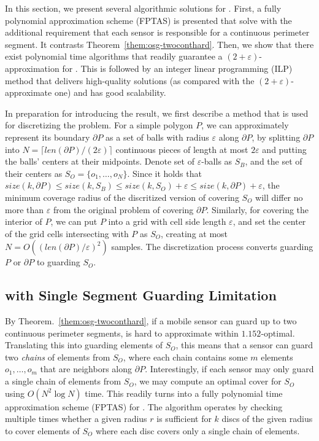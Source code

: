 \def\algomed{\textsc{Min\_Enclose\_Disc}\xspace}
In this section, we present several algorithmic solutions for \osgt. 
First, a fully polynomial approximation scheme (FPTAS)
is presented that solve \opgt with the additional requirement 
that each sensor is responsible for a continuous perimeter segment. 
It contrasts Theorem~\ref{them:osg-twoconthard}. Then, we show that 
there exist polynomial time algorithms that readily guarantee a
$(2+\varepsilon)$-approximation for \osgt. This is followed by an 
integer linear programming (ILP) method that delivers high-quality
solutions (as compared with the $(2 + \varepsilon)$-approximate one)
and has good scalability. 

In preparation for introducing the result, we first describe a method
that is used for discretizing the problem. For a simple polygon $P$, 
we can approximately represent its boundary $\partial P$ as a set of 
balls with radius $\varepsilon$ along $\partial P$, by splitting  
$\partial P$ into $N=\lceil{len(\partial P)}/({2\varepsilon})\rceil$ 
continuous pieces of length at most $2\varepsilon$ and putting the balls' 
centers at their midpoints. 
%
Denote set of $\varepsilon$-balls as $S_B$, and the set of their centers 
as $S_O=\{o_1,\dots, o_N\}$. Since it holds that $size(k,\partial P) \leq 
size(k, S_B) \leq size(k, S_O) + \varepsilon \leq size(k, \partial P) 
+ \varepsilon$, the minimum coverage radius of the discritized version 
of covering $S_O$ will differ no more than $\varepsilon$ from the original 
problem of covering $\partial P$. Similarly, for covering the interior 
of $P$, we can put $P$ into a grid with cell side length $\varepsilon$, 
and set the center of the grid cells intersecting with $P$ as $S_O$, 
creating at most $N=O(({len(\partial P)}/{\varepsilon})^2)$ samples. 
The discretization process converts guarding $P$ or $\partial P$ to 
guarding $S_O$. 

\subsection{\opgt with Single Segment Guarding Limitation}\label{subsec:osg-singleseg}
By Theorem.~\ref{them:osg-twoconthard}, if a mobile sensor can guard up to two 
continuous perimeter segments, \osgt is hard to approximate within 
$1.152$-optimal. 
Translating this into guarding elements of $S_O$, this means that a sensor
can guard two {\em chains} of elements from $S_O$, where each chain contains 
some $m$ elements $o_1, \ldots, o_m$ that are neighbors along $\partial P$. 
Interestingly, if each sensor may only guard a single chain of elements 
from $S_O$, we may compute an optimal cover for $S_O$ using $O(N^2 \log N)$ 
time. This readily turns into a fully polynomial time approximation scheme 
(FPTAS) for \opgt. 
The algorithm operates by checking multiple times whether a given radius 
$r$ is sufficient for $k$ discs of the given radius to cover elements of 
$S_O$ where each disc covers only a single chain of elements. 

